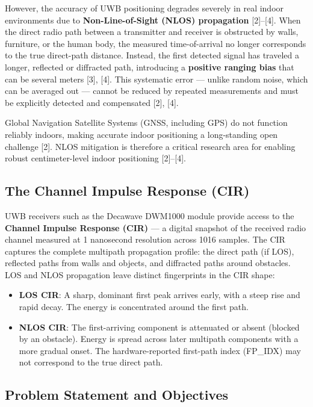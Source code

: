 \documentclass[12pt,a4paper]{article}
\providecommand{\tightlist}{%
  \setlength{\itemsep}{0pt}\setlength{\parskip}{0pt}}
\begin{document}
However, the accuracy of UWB positioning degrades severely in real
indoor environments due to \textbf{Non-Line-of-Sight (NLOS) propagation}
{[}2{]}--{[}4{]}. When the direct radio path between a transmitter and
receiver is obstructed by walls, furniture, or the human body, the
measured time-of-arrival no longer corresponds to the true direct-path
distance. Instead, the first detected signal has traveled a longer,
reflected or diffracted path, introducing a \textbf{positive ranging
bias} that can be several meters {[}3{]}, {[}4{]}. This systematic error
--- unlike random noise, which can be averaged out --- cannot be reduced
by repeated measurements and must be explicitly detected and compensated
{[}2{]}, {[}4{]}.

Global Navigation Satellite Systems (GNSS, including GPS) do not
function reliably indoors, making accurate indoor positioning a
long-standing open challenge {[}2{]}. NLOS mitigation is therefore a
critical research area for enabling robust centimeter-level indoor
positioning {[}2{]}--{[}4{]}.

\subsection{The Channel Impulse Response
(CIR)}\label{the-channel-impulse-response-cir}

UWB receivers such as the Decawave DWM1000 module provide access to the
\textbf{Channel Impulse Response (CIR)} --- a digital snapshot of the
received radio channel measured at 1 nanosecond resolution across 1016
samples. The CIR captures the complete multipath propagation profile:
the direct path (if LOS), reflected paths from walls and objects, and
diffracted paths around obstacles. LOS and NLOS propagation leave
distinct fingerprints in the CIR shape:

\begin{itemize}
\tightlist
\item
  \textbf{LOS CIR}: A sharp, dominant first peak arrives early, with a
  steep rise and rapid decay. The energy is concentrated around the
  first path.
\item
  \textbf{NLOS CIR}: The first-arriving component is attenuated or
  absent (blocked by an obstacle). Energy is spread across later
  multipath components with a more gradual onset. The hardware-reported
  first-path index (FP\_IDX) may not correspond to the true direct path.
\end{itemize}

\subsection{Problem Statement and
Objectives}\label{problem-statement-and-objectives}
\end{document}
